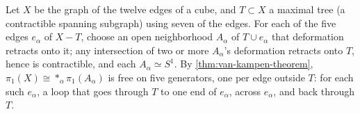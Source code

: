 \begin{example}
\label{ex:cube-graph-fundamental-group-free}
Let $X$ be the graph of the twelve edges of a cube, and $T \subset X$ a maximal
tree (a contractible spanning subgraph) using seven of the edges. For each of the
five edges $e_\alpha$ of $X - T$, choose an open neighborhood $A_\alpha$ of $T\cup e_\alpha$ that
deformation retracts onto it; any intersection of two or more $A_\alpha$'s deformation
retracts onto $T$, hence is contractible, and each $A_\alpha \simeq S^1$. By
\cref{thm:van-kampen-theorem}, $\pi_1(X) \cong *_\alpha \pi_1(A_\alpha)$ is free on five generators, one
per edge outside $T$: for each such $e_\alpha$, a loop that goes through $T$ to one end of
$e_\alpha$, across $e_\alpha$, and back through $T$.


\end{example}
